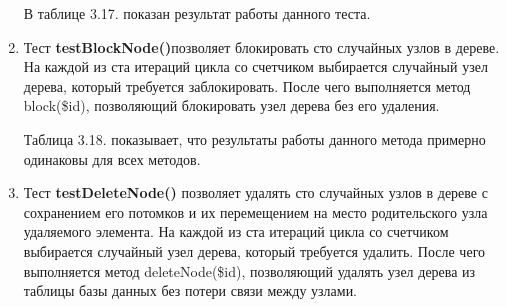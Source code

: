 \documentclass[a4paper,14pt]{extreport}
\theoremstyle{definition}
\begin{document}
\begin{enumerate}
В таблице 3.17. показан результат работы данного теста.
\begin{table}[H]
\end{table}
\item Тест \textbf{testBlockNode()}позволяет блокировать сто случайных узлов в дереве. На каждой из ста итераций цикла со счетчиком выбирается случайный узел дерева, который требуется заблокировать. После чего выполняется метод block(\$id), позволяющий блокировать узел дерева без его удаления.

Таблица 3.18. показывает, что результаты работы данного метода примерно одинаковы для всех методов.
\begin{table}[H]
\end{table}
\item Тест \textbf{testDeleteNode()} позволяет удалять сто случайных узлов в дереве с сохранением его потомков и их перемещением на место родительского узла удаляемого элемента. На каждой из ста итераций цикла со счетчиком выбирается случайный узел дерева, который требуется удалить. После чего выполняется метод deleteNode(\$id), позволяющий удалять узел дерева из таблицы базы данных без потери связи между узлами.


\end{enumerate}
\end{document}
